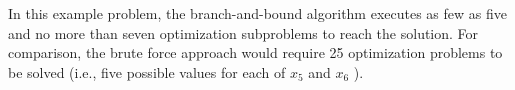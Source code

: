 In this example problem, the branch-and-bound algorithm executes as
few as five and no more than seven optimization subproblems to reach
the solution. For comparison, the brute force approach would require
25 optimization problems to be solved (i.e., five possible values for
each of $x_{5}$ and $x_{6}$ ).


